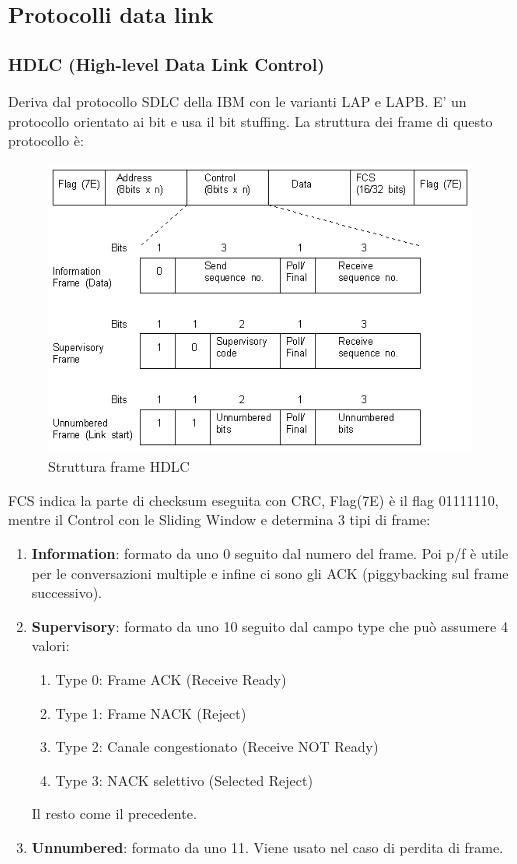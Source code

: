 \subsection{Protocolli data link}
\subsubsection{HDLC (High-level Data Link Control)}
Deriva dal protocollo SDLC della IBM con le varianti LAP e LAPB. E' un protocollo orientato ai bit e usa il bit stuffing. La struttura dei frame di questo protocollo è:
\begin{figure}[htbp]
\centering
\includegraphics[scale=0.8]{images/hdlc.png}
\caption{Struttura frame HDLC}
\end{figure}
FCS indica la parte di checksum eseguita con CRC, Flag(7E) è il flag 01111110, mentre il Control con le Sliding Window e determina 3 tipi di frame:
\begin{enumerate}
\item{\textbf{Information}: formato da uno 0 seguito dal numero del frame. Poi p/f è utile per le conversazioni multiple e infine ci sono gli ACK (piggybacking sul frame successivo).}
\item{\textbf{Supervisory}: formato da uno 10 seguito dal campo type che può assumere 4 valori:
\begin{enumerate}
\item {Type 0: Frame ACK (Receive Ready)}
\item {Type 1: Frame NACK (Reject)}
\item {Type 2: Canale congestionato (Receive NOT Ready)}
\item {Type 3: NACK selettivo (Selected Reject)}
\end{enumerate}
Il resto come il precedente.}
\item{\textbf{Unnumbered}: formato da uno 11. Viene usato nel caso di perdita di frame.}
\end{enumerate}

